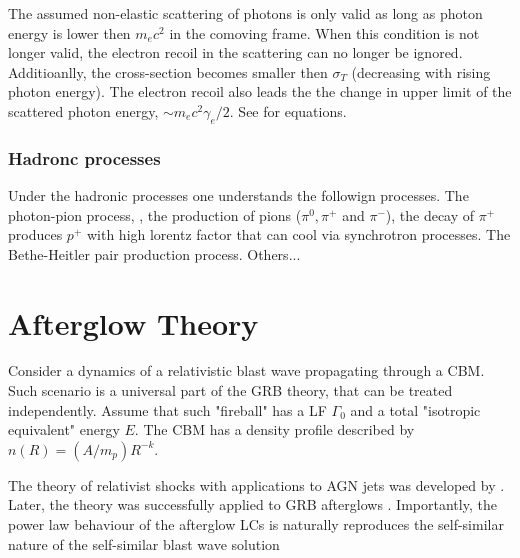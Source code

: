 The assumed non-elastic scattering of photons is only valid as long as photon energy is lower then $m_e c^2$ in the comoving frame. When this condition is not longer valid, the electron recoil in the scattering can no longer be ignored. Additioanlly, the cross-section becomes smaller then $\sigma_T$ (decreasing with rising photon energy). 
The electron recoil also leads the the change in upper limit of the scattered photon energy, $\sim m_e c^2 \gamma_e / 2$. See \citet{RybickiLightman:1985} for equations.


\subsubsection{Hadronc processes}

Under the hadronic processes one understands the followign processes.
The photon-pion process, \ie, the production of pions ($\pi^0, \pi^+$ and $\pi^-$), the decay of $\pi^+$ produces $p^+$ with high lorentz factor that can cool via synchrotron processes.
The Bethe-Heitler pair production process.
Others...


\section{Afterglow Theory}

Consider a dynamics of a relativistic blast wave propagating through a \ac{CBM}. Such scenario is a universal part of the \ac{GRB} theory, that can be treated independently. 
Assume that such "fireball" has a \ac{LF} $\Gamma_0$ and a total "isotropic equivalent" energy $E$. The \ac{CBM} has a density profile described by $n(R) = (A/m_p)R^{-k}$.

The theory of relativist shocks with applications to \ac{AGN} jets was developed by \citep{Blandford:1976}. Later, the theory was successfully applied to \ac{GRB} afterglows \citep{Costa:1997cg,vanParadijs:1997wr,Frail:1997qf}.
Importantly, the power law behaviour of the afterglow \acp{LC} is naturally reproduces the self-similar nature of the self-similar blast wave solution